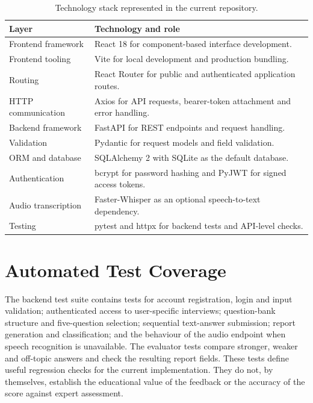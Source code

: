 \documentclass[12pt,a4paper,oneside]{report}
\begin{document}
\begin{table}[H]
\centering
\small
\begin{tabularx}{\textwidth}{>{\RaggedRight\arraybackslash}p{3.4cm} X}
\toprule
\textbf{Layer} & \textbf{Technology and role} \\
\midrule
Frontend framework & React 18 for component-based interface development. \\
Frontend tooling & Vite for local development and production bundling. \\
Routing & React Router for public and authenticated application routes. \\
HTTP communication & Axios for API requests, bearer-token attachment and error handling. \\
Backend framework & FastAPI for REST endpoints and request handling. \\
Validation & Pydantic for request models and field validation. \\
ORM and database & SQLAlchemy 2 with SQLite as the default database. \\
Authentication & bcrypt for password hashing and PyJWT for signed access tokens. \\
Audio transcription & Faster-Whisper as an optional speech-to-text dependency. \\
Testing & pytest and httpx for backend tests and API-level checks. \\
\bottomrule
\end{tabularx}
\caption{Technology stack represented in the current repository.}
\label{tab:technology-stack}
\end{table}

\section{Automated Test Coverage}
The backend test suite contains tests for account registration, login and input validation; authenticated access to user-specific interviews; question-bank structure and five-question selection; sequential text-answer submission; report generation and classification; and the behaviour of the audio endpoint when speech recognition is unavailable. The evaluator tests compare stronger, weaker and off-topic answers and check the resulting report fields. These tests define useful regression checks for the current implementation. They do not, by themselves, establish the educational value of the feedback or the accuracy of the score against expert assessment.
\end{document}

